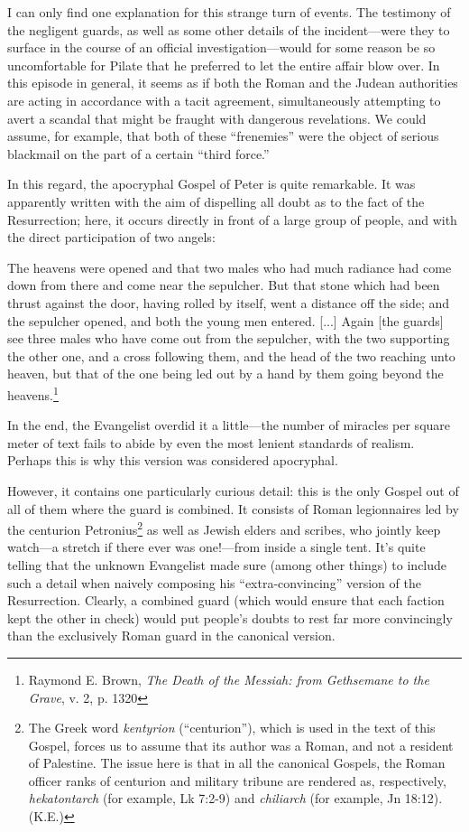 I can only find one explanation for this strange turn of events. The testimony of the negligent guards, as well as some other details of the incident---were they to surface in the course of an official investigation---would for some reason be so uncomfortable for Pilate that he preferred to let the entire affair blow over. In this episode in general, it seems as if both the Roman and the Judean authorities are acting in accordance with a tacit agreement, simultaneously attempting to avert a scandal that might be fraught with dangerous revelations. We could assume, for example, that both of these ``frenemies'' were the object of serious blackmail on the part of a certain ``third force.''

In this regard, the apocryphal Gospel of Peter is quite remarkable. It was apparently written with the aim of dispelling all doubt as to the fact of the Resurrection; here, it occurs directly in front of a large group of people, and with the direct participation of two angels:

\begin{smallquote}
    The heavens were opened and that two males who had much radiance had come down from there and come near the sepulcher. But that stone which had been thrust against the door, having rolled by itself, went a distance off the side; and the sepulcher opened, and both the young men entered. [...] Again [the guards] see three males who have come out from the sepulcher, with the two supporting the other one, and a cross following them, and the head of the two reaching unto heaven, but that of the one being led out by a hand by them going beyond the heavens.\footnote{Raymond E. Brown, \emph{The Death of the Messiah: from Gethsemane to the Grave}, v. 2, p. 1320}
\end{smallquote}
In the end, the Evangelist overdid it a little---the number of miracles per square meter of text fails to abide by even the most lenient standards of realism. Perhaps this is why this version was considered apocryphal.

However, it contains one particularly curious detail: this is the only Gospel out of all of them where the guard is combined. It consists of Roman legionnaires led by the centurion Petronius\footnote{The Greek word \emph{kentyrion} (``centurion''), which is used in the text of this Gospel, forces us to assume that its author was a Roman, and not a resident of Palestine. The issue here is that in all the canonical Gospels, the Roman officer ranks of centurion and military tribune are rendered as, respectively, \emph{hekatontarch} (for example, Lk 7:2-9) and \emph{chiliarch} (for example, Jn 18:12). (K.E.)} as well as Jewish elders and scribes, who jointly keep watch---a stretch if there ever was one!---from inside a single tent. It's quite telling that the unknown Evangelist made sure (among other things) to include such a detail when naively composing his ``extra-convincing'' version of the Resurrection. Clearly, a combined guard (which would ensure that each faction kept the other in check) would put people's doubts to rest far more convincingly than the exclusively Roman guard in the canonical version.

